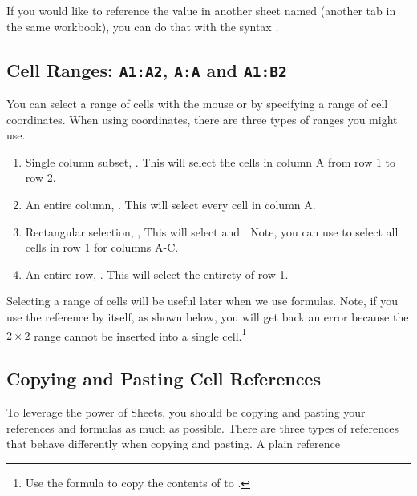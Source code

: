 If you would like to reference the value in another sheet named  (another tab in the same workbook), you can do that with the syntax . 


\subsection{Cell Ranges: \texttt{A1:A2}, \texttt{A:A} and \texttt{A1:B2}}

You can select a range of cells with the mouse or by specifying a range of cell coordinates. When using coordinates, there are three types of ranges you might use. 

\begin{enumerate}
    \item Single column subset, . This will select the cells in column A from row 1 to row 2.
    \item An entire column, . This will select every cell in column A. 
    \item Rectangular selection, , This will select  and . Note, you can use  to select all cells in row 1 for columns A-C.
    \item An entire row, . This will select the entirety of row 1. 
\end{enumerate}

Selecting a range of cells will be useful later when we use formulas. Note, if you use the reference  by itself, as shown below, you will get back an error because the $2\times 2$ range cannot be inserted into a single cell.\footnote{Use the formula  to copy the contents of  to .}
\begin{center}
\end{center}

\subsection{Copying and Pasting Cell References}

To leverage the power of Sheets, you should be copying and pasting your references and formulas as much as possible. There are three types of references that behave differently when copying and pasting. A plain  reference 

